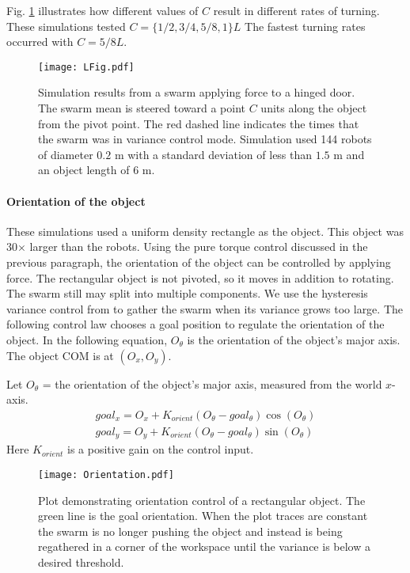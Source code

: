  Fig. \ref{fig:LFig} illustrates how different values of $C$ result in different rates of turning. These simulations tested $C = \{1/2, 3/4, 5/8, 1\}L$  The fastest turning rates occurred with  $C =  5/8L$. 



\begin{figure}
\begin{center}
	\texttt{[image: LFig.pdf]}
\end{center}
\vspace{-1em}
\caption{\label{fig:LFig}
Simulation results from a swarm applying force to a hinged door. 
The swarm mean is steered toward a point $C$ units along the object from the pivot point. The red dashed line indicates the times that the swarm was in variance control mode.
 Simulation used 144 robots of diameter $0.2$ m with a standard deviation of less than $1.5$ m and an object length of $6$ m.
}
\vspace{-1em}
\end{figure}


\paragraph{Orientation of the object}
These simulations used a uniform density rectangle as the object. This object was 30$\times$ larger than the robots.
Using the pure torque control discussed in the previous paragraph, the orientation of the object can be controlled by applying force. 
The rectangular object is not pivoted, so it moves in addition to rotating. 
 The swarm still may split into multiple components.
  We use the hysteresis variance control from \cite{ShahrokhiIROS2015}  to gather the swarm when its variance grows too large. 
  The following control law chooses a goal position to regulate the orientation of the object.  In the following equation, $O_{\theta}$ is the orientation of the object's major axis. The object COM is at $(O_x,O_y)$.

Let $O_{\theta}$ = the orientation of the object's major axis, measured from the world $x$-axis.
\begin{align}\nonumber
goal_x = O_x +  K_{orient}  (O_{\theta} - goal_\theta ) \cos(O_{\theta}) \\
goal_y = O_y +  K_{orient}  ( O_{\theta} -goal_\theta  ) \sin(O_{\theta})
\end{align}
Here $K_{orient}$ is a positive gain on the control input.  


\begin{figure}
\begin{center}
	\texttt{[image: Orientation.pdf]}
\end{center}
\vspace{-1em}
\caption{\label{fig:OrientCont}
Plot demonstrating  orientation control of a rectangular object. The green line is the goal orientation.   When the plot traces are constant the swarm is no longer pushing the object and instead is being regathered in a corner of the workspace until the variance is below a desired threshold. 
}
\vspace{-1em}
\end{figure}

